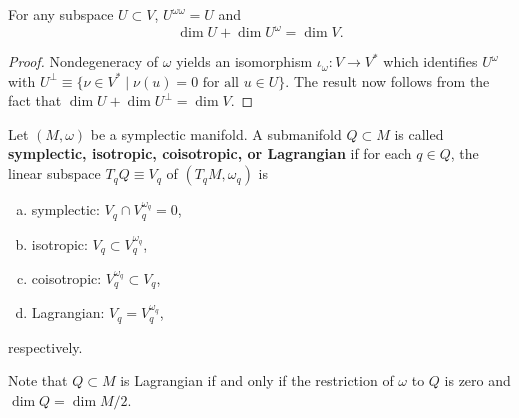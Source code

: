 \documentclass{amsart}
\begin{document}
\begin{lemma}
    For any subspace $U\subset V$, $U^{\omega\omega}=U$ and
    \begin{equation*}
        \dim U + \dim U^{\omega} = \dim V.
    \end{equation*}
    \label{lem:dim}
\end{lemma}
\begin{proof}
    Nondegeneracy of $\omega$ yields an isomorphism $\iota_{\omega}:V\to V^*$ which identifies
    $U^\omega$ with $U^{\perp}\equiv\{\nu\in V^*\mid \nu(u)=0\text{ for all }u\in U\}$. The result
    now follows from the fact that $\dim U + \dim U^{\perp} = \dim V$.
\end{proof}

\begin{definition}
    Let $(M,\omega)$ be a symplectic manifold. A submanifold $Q\subset M$ is called
    \textbf{symplectic, isotropic, coisotropic, or Lagrangian} if for each $q\in Q$, the linear
    subspace $T_qQ\equiv V_q$ of $(T_qM,\omega_q)$ is
    \begin{enumerate}[(a)]
        \item symplectic: $V_q\cap V_q^{\omega_q}=0$,
        \item isotropic: $V_q\subset V_q^{\omega_q}$,
        \item coisotropic: $V_q^{\omega_q}\subset V_q$,
        \item Lagrangian: $V_q=V_q^{\omega_q}$,
    \end{enumerate}
    respectively.
\end{definition}

\begin{remark}
    Note that $Q\subset M$ is Lagrangian if and only if the restriction of $\omega$ to $Q$
    is zero and $\dim Q=\dim M/2$.
\end{remark}
\end{document}
